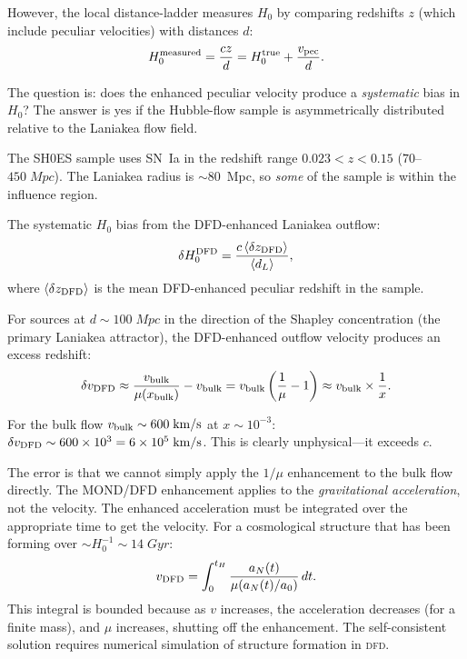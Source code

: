 \documentclass[aps,prd,twocolumn,superscriptaddress,nofootinbib,longbibliography]{revtex4-2}
\newcommand{\DFD}{\textsc{dfd}}
\begin{document}
However, the local distance-ladder measures $H_0$ by comparing redshifts
$z$ (which include peculiar velocities) with distances $d$:
\begin{equation}
H_0^{\rm measured} = \frac{cz}{d} = H_0^{\rm true} + \frac{v_{\rm pec}}{d}.
\end{equation}

The question is: does the enhanced peculiar velocity produce a
\emph{systematic} bias in $H_0$? The answer is yes if the Hubble-flow
sample is asymmetrically distributed relative to the Laniakea flow field.

The SH0ES sample uses SN~Ia in the redshift range $0.023 < z < 0.15$
($70$--$450\;\si{Mpc}$). The Laniakea radius is $\sim$80~Mpc, so
\emph{some} of the sample is within the influence region.

The systematic $H_0$ bias from the DFD-enhanced Laniakea outflow:
\begin{equation}\label{eq:H0-bias-final}
\delta H_0^{\rm DFD} = \frac{c\,\langle\delta z_{\rm DFD}\rangle}
{\langle d_L\rangle},
\end{equation}
where $\langle\delta z_{\rm DFD}\rangle$ is the mean DFD-enhanced
peculiar redshift in the sample.

For sources at $d \sim 100\;\si{Mpc}$ in the direction of the Shapley
concentration (the primary Laniakea attractor), the DFD-enhanced outflow
velocity produces an excess redshift:
\begin{equation}
\delta v_{\rm DFD} \approx \frac{v_{\rm bulk}}{\mu(x_{\rm bulk})} - v_{\rm bulk}
= v_{\rm bulk}\left(\frac{1}{\mu} - 1\right)
\approx v_{\rm bulk}\times\frac{1}{x}.
\end{equation}

For the bulk flow $v_{\rm bulk} \sim 600\;\si{km/s}$ at $x \sim 10^{-3}$:
$\delta v_{\rm DFD} \sim 600\times10^3 = 6\times10^5\;\si{km/s}$.
This is clearly unphysical---it exceeds $c$.

The error is that we cannot simply apply the $1/\mu$ enhancement
to the bulk flow directly. The MOND/DFD enhancement applies to the
\emph{gravitational acceleration}, not the velocity. The enhanced
acceleration must be integrated over the appropriate time to get the
velocity. For a cosmological structure that has been forming over
$\sim H_0^{-1} \sim 14\;\si{Gyr}$:
\begin{equation}
v_{\rm DFD} = \int_0^{t_H} \frac{a_N(t)}{\mu(a_N(t)/a_0)}\,dt.
\end{equation}
This integral is bounded because as $v$ increases, the acceleration
decreases (for a finite mass), and $\mu$ increases, shutting off the
enhancement. The self-consistent solution requires numerical
simulation of structure formation in \DFD.
\end{document}
